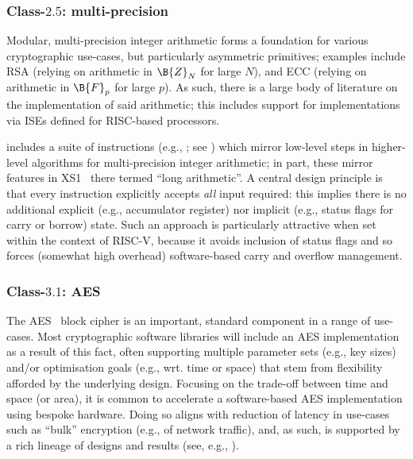 
\subsubsection{Class-$2.5$: multi-precision}
\label{sec:bg:feature:2:5}

Modular, multi-precision integer arithmetic forms a foundation for various
cryptographic use-cases, but particularly asymmetric primitives; examples 
include
RSA (relying on arithmetic in $\B{Z}_N$ for large $N$),
and
ECC (relying on arithmetic in $\B{F}_p$ for large $p$).
As such, there is a large body of literature on the implementation of said 
arithmetic; this includes support for implementations via ISEs defined for 
RISC-based processors.

\XCRYPTO includes a suite of instructions 
(e.g., ; see )
which mirror low-level steps in higher-level algorithms for multi-precision 
integer arithmetic; in part, these mirror features in 
XS1~\cite[Section 18]{SCARV:XS1:09} 
there termed ``long arithmetic''.  A central design principle is that every
instruction explicitly accepts {\em all} input required: this implies there
is no additional
explicit (e.g., accumulator register) 
nor 
implicit (e.g., status flags for carry or borrow)
state.
Such an approach is particularly attractive when set within the context of 
RISC-V, because it avoids inclusion of status flags and so forces (somewhat 
high overhead) software-based carry and overflow management.


\subsubsection{Class-$3.1$: AES}
\label{sec:bg:feature:3:1}

The 
AES~\cite{SCARV:FIPS:197} 
block cipher is an important, standard component in a range of use-cases.  
Most cryptographic software libraries will include an AES implementation 
as a result of this fact, often supporting multiple 
parameter sets     (e.g., key sizes)
and/or
optimisation goals (e.g., wrt. time or space)
that stem from flexibility afforded by the underlying design.
Focusing on the trade-off between time and space (or area), it is common
to accelerate a software-based AES implementation using bespoke hardware.
Doing so aligns with reduction of latency in use-cases such as ``bulk''
encryption (e.g., of network traffic), and, as such, is supported by a
rich lineage of designs and results (see, e.g., ).

